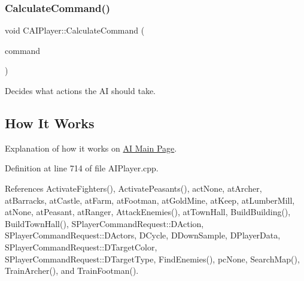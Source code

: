 \hypertarget{classCAIPlayer_ae2742efd250c7d6c00b659ccc29c4be3}{}\label{classCAIPlayer_ae2742efd250c7d6c00b659ccc29c4be3} 
\subsubsection{\texorpdfstring{Calculate\+Command()}{CalculateCommand()}}
{\footnotesize\ttfamily void C\+A\+I\+Player\+::\+Calculate\+Command (\begin{DoxyParamCaption}\item[{\hyperlink{structSPlayerCommandRequest}{S\+Player\+Command\+Request} \&}]{command }\end{DoxyParamCaption})}



Decides what actions the AI should take. 

\hypertarget{classCAIPlayer_cchow_sec}{}\subsection{How It Works}\label{classCAIPlayer_cchow_sec}
Explanation of how it works on \hyperlink{index}{AI Main Page}. 

Definition at line 714 of file A\+I\+Player.\+cpp.



References Activate\+Fighters(), Activate\+Peasants(), act\+None, at\+Archer, at\+Barracks, at\+Castle, at\+Farm, at\+Footman, at\+Gold\+Mine, at\+Keep, at\+Lumber\+Mill, at\+None, at\+Peasant, at\+Ranger, Attack\+Enemies(), at\+Town\+Hall, Build\+Building(), Build\+Town\+Hall(), S\+Player\+Command\+Request\+::\+D\+Action, S\+Player\+Command\+Request\+::\+D\+Actors, D\+Cycle, D\+Down\+Sample, D\+Player\+Data, S\+Player\+Command\+Request\+::\+D\+Target\+Color, S\+Player\+Command\+Request\+::\+D\+Target\+Type, Find\+Enemies(), pc\+None, Search\+Map(), Train\+Archer(), and Train\+Footman().


